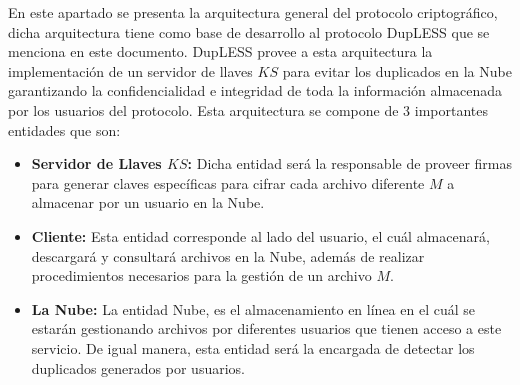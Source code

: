 En este apartado se presenta la arquitectura general del protocolo criptográfico, dicha arquitectura tiene como base de desarrollo al protocolo DupLESS que se menciona en este documento. DupLESS provee a esta arquitectura la implementación de un servidor de llaves $KS$ para evitar los duplicados en la Nube garantizando la confidencialidad e integridad de toda la información almacenada por los usuarios del protocolo. Esta arquitectura se compone de 3 importantes entidades que son: 
\begin{itemize}
	\item \textbf{Servidor de Llaves $KS$: } Dicha entidad será la responsable de proveer firmas para generar claves específicas para cifrar cada archivo diferente $M$ a almacenar por un usuario en la Nube.
	\item \textbf{Cliente: } Esta entidad corresponde al lado del usuario, el cuál almacenará, descargará y consultará archivos en la Nube, además de realizar procedimientos necesarios para la gestión de un archivo $M$. 
	\item \textbf{La Nube: } La entidad Nube, es el almacenamiento en línea en el cuál se estarán gestionando archivos por diferentes usuarios que tienen acceso a este servicio. De igual manera, esta entidad será la encargada de detectar los duplicados generados por usuarios.
\end{itemize}

